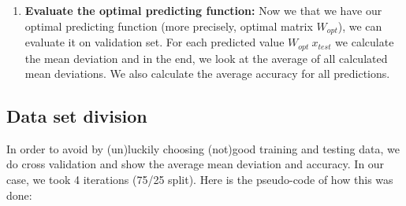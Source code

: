 \documentclass[a4paper,11pt,oneside]{article}
\begin{document}
\begin{enumerate}
\begin{center}
{  			{\bf Result:} A $k \times m$ dimensional weight matrix $W_{opt}$ which solves the following linear regression objective:
	  			\begin{equation}
	  				W_{opt} = \operatorname*{argmin}_{W \in \mathbb{R}^{k  \times m}} \sum_{i=1}^{N} || W x_i - y_i || ^ 2
	  			\end{equation} 
  			{\bf Step 1: } Sort the feature vectors row-wise into an $N \times m$ matrix $\Phi$ and the targets into an $N \times k$ matrix Z.
  			
  			{\bf Step 2:} Compute the result by $W_{opt}' = (\Phi' \Phi)^{-1}\Phi'Z$
  			
  			{\bf Step 2*:} We perform slight modification in this step to avoid numerical issues like inverting the singular matrix. These issues can be avoided by taking pseudo-inverse \cite{mllecturenotes}:
  			\begin{equation}
  				W_{opt}' = pseudoInverse(\Phi) Z
  			\end{equation}
  			In python we could implement it the following way:
  			\begin{equation}
  				Wopt = (np.linalg.pinv(Phi).dot(Z)).T
  			\end{equation} 
  			where matrices are 2D numpy \cite{numpy} arrays.
  			"This still gives optimal weights" \cite{mllecturenotes}.
  			}
 
    \end{center}
  	
  	\item {\bf Evaluate the optimal predicting function: } Now we that we have our optimal predicting function (more precisely, optimal matrix $W_{opt}$), we can evaluate it on validation set. For each predicted value $ W_{opt}\ x_{test}$ we calculate the mean deviation and in the end, we look at the average of all calculated mean deviations. We also calculate the average accuracy for all predictions.
  	
  \end{enumerate} 

  \subsection{Data set division}
  
  In order to avoid by (un)luckily choosing (not)good training and testing data, we do cross validation and show the average mean deviation and accuracy. In our case, we took 4 iterations (75/25 split). Here is the pseudo-code of how this was done:
  
\end{document}
